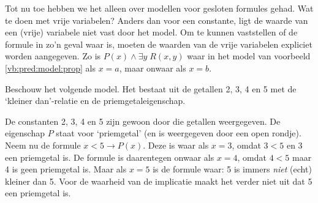 Tot nu toe hebben we het alleen over modellen voor gesloten formules gehad. Wat te doen met vrije variabelen? Anders dan voor een constante, ligt de waarde van een (vrije) variabele niet vast door het model. Om te kunnen vaststellen of de formule in zo'n geval waar is, moeten de waarden van de vrije variabelen expliciet worden aangegeven. Zo is $P(x)\wedge\exists y\;R(x,y)$ waar in het model van voorbeeld \ref{vb:pred:model:prop} als $x=a$, maar onwaar als $x=b$.
\begin{example}
Beschouw het volgende model. Het bestaat uit de getallen 2, 3, 4 en 5 met de `kleiner dan'-relatie en de priemgetaleigenschap.
\begin{center}
\end{center}
De constanten 2, 3, 4 en 5 zijn gewoon door die getallen weergegeven. De eigenschap $P$ staat voor `priemgetal' (en is weergegeven door een open rondje). Neem nu de formule $x<5\rightarrow P(x)$. Deze is waar als $x=3$, omdat $3<5$ en 3 een priemgetal is. De formule is daarentegen onwaar als $x=4$, omdat $4<5$ maar 4 is geen priemgetal is. Maar als $x=5$ is de formule waar: 5 is immers \textit{niet} (echt) kleiner dan 5. Voor de waarheid van de implicatie maakt het verder niet uit dat 5 een priemgetal is.
\end{example}

